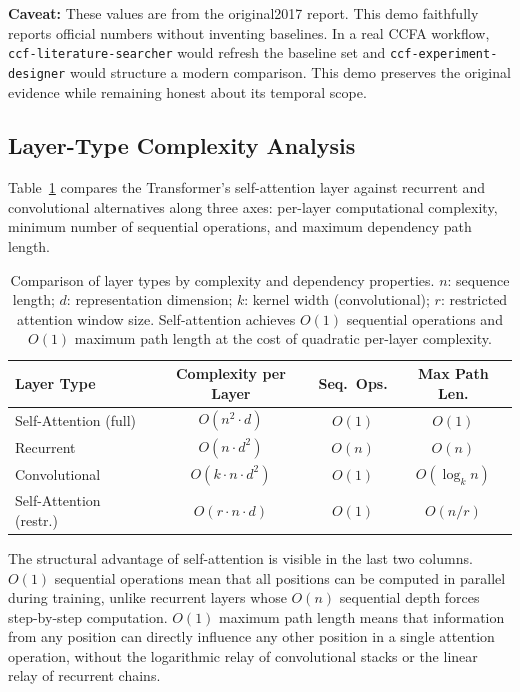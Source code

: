 ﻿\documentclass{article}
\begin{document}
\textbf{Caveat:} These values are from the original2017 report. This demo faithfully reports official numbers without inventing baselines. In a real CCFA workflow, \texttt{ccf-literature-searcher} would refresh the baseline set and \texttt{ccf-experiment-designer} would structure a modern comparison. This demo preserves the original evidence while remaining honest about its temporal scope.

\subsection{Layer-Type Complexity Analysis}

Table~\ref{tab:complexity} compares the Transformer's self-attention layer against recurrent and convolutional alternatives along three axes: per-layer computational complexity, minimum number of sequential operations, and maximum dependency path length.

\begin{table}[t]
 \centering
 \caption{Comparison of layer types by complexity and dependency properties. $n$: sequence length; $d$: representation dimension; $k$: kernel width (convolutional); $r$: restricted attention window size. Self-attention achieves $O(1)$ sequential operations and $O(1)$ maximum path length at the cost of quadratic per-layer complexity.}
 \label{tab:complexity}
 \small
 \begin{tabular}{l c c c}
 \toprule
 Layer Type & Complexity per Layer & Seq.\ Ops. & Max Path Len. \\
 \midrule
 Self-Attention (full) & $O(n^2 \cdot d)$ & $O(1)$ & $O(1)$ \\
 Recurrent & $O(n \cdot d^2)$ & $O(n)$ & $O(n)$ \\
 Convolutional & $O(k \cdot n \cdot d^2)$ & $O(1)$ & $O(\log_k n)$ \\
 Self-Attention (restr.)& $O(r \cdot n \cdot d)$ & $O(1)$ & $O(n/r)$ \\
 \bottomrule
 \end{tabular}
\end{table}

The structural advantage of self-attention is visible in the last two columns. $O(1)$ sequential operations mean that all positions can be computed in parallel during training, unlike recurrent layers whose $O(n)$ sequential depth forces step-by-step computation. $O(1)$ maximum path length means that information from any position can directly influence any other position in a single attention operation, without the logarithmic relay of convolutional stacks or the linear relay of recurrent chains.
\end{document}
